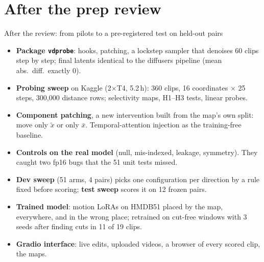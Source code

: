 \documentclass[aspectratio=169,11pt]{beamer}
\newcommand{\xs}{\bar{x}}
\newcommand{\xd}{\tilde{x}}
\newcommand{\code}[1]{\texttt{#1}}
\begin{document}
\section{After the prep review}
\begin{frame}{After the review: from pilots to a pre-registered test on held-out pairs}
  \small
  \begin{itemize}\setlength{\itemsep}{1.2mm}
    \item \textbf{Package \code{vdprobe}}: hooks, patching, a lockstep sampler that denoises 60 clips
      step by step; final latents identical to the diffusers pipeline (mean abs.\ diff.\ exactly 0).
    \item \textbf{Probing sweep} on Kaggle (2$\times$T4, 5.2\,h): 360 clips, 16 coordinates $\times$ 25
      steps, 300{,}000 distance rows; selectivity maps, H1--H3 tests, linear probes.
    \item \textbf{Component patching}, a new intervention built from the map's own split: move only
      $\xd$ or only $\xs$. Temporal-attention injection as the training-free baseline.
    \item \textbf{Controls on the real model} (null, mis-indexed, leakage, symmetry). They caught two
      fp16 bugs that the 51 unit tests missed.
    \item \textbf{Dev sweep} (51 arms, 4 pairs) picks one configuration per direction by a rule fixed
      before scoring; \textbf{test sweep} scores it on 12 frozen pairs.
    \item \textbf{Trained model}: motion LoRAs on HMDB51 placed by the map, everywhere, and in the wrong
      place; retrained on cut-free windows with 3 seeds after finding cuts in 11 of 19 clips.
    \item \textbf{Gradio interface}: live edits, uploaded videos, a browser of every scored clip, the maps.
  \end{itemize}
\end{frame}

\end{document}
